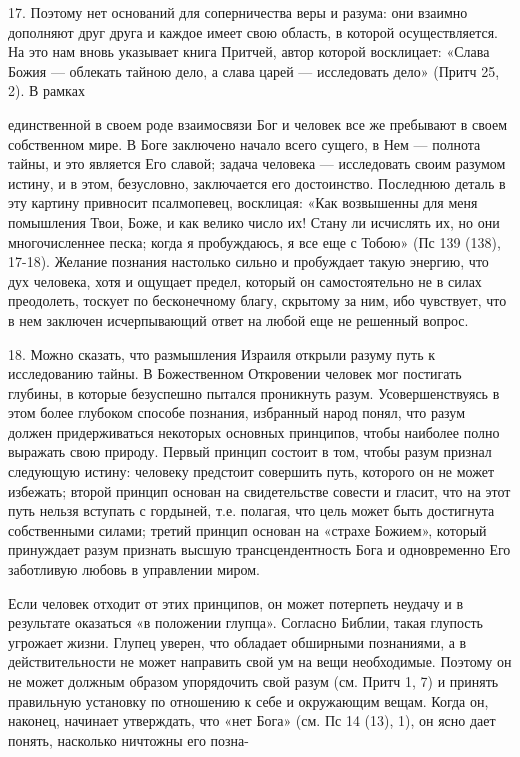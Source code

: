 \documentclass[a5paper,10pt]{article}
\begin{document}
17. Поэтому нет оснований для соперничества веры и разума: они взаимно
дополняют друг друга и каждое имеет свою область, в которой осуществляется. На
это нам вновь указывает книга Притчей, автор которой восклицает: «Слава Божия —
облекать тайною дело, а слава царей — исследовать дело» (Притч 25, 2). В рамках

единственной в своем роде взаимосвязи Бог и человек все же пребывают в своем
собственном мире. В Боге заключено начало всего сущего, в Нем — полнота тайны,
и это является Его славой; задача человека — исследовать своим разумом истину,
и в этом, безусловно, заключается его достоинство. Последнюю деталь в эту
картину привносит псалмопевец, восклицая: «Как возвышенны для меня помышления
Твои, Боже, и как велико число их! Стану ли исчислять их, но они многочисленнее
песка; когда я пробуждаюсь, я все еще с Тобою» (Пс 139 (138), 17-18). Желание
познания настолько сильно и пробуждает такую энергию, что дух человека, хотя и
ощущает предел, который он самостоятельно не в силах преодолеть, тоскует по
бесконечному благу, скрытому за ним, ибо чувствует, что в нем заключен
исчерпывающий ответ на любой еще не решенный вопрос.

18. Можно сказать, что размышления Израиля открыли разуму путь к исследованию
тайны. В Божественном Откровении человек мог постигать глубины, в которые
безуспешно пытался проникнуть разум. Усовершенствуясь в этом более глубоком
способе познания, избранный народ понял, что разум должен придерживаться
некоторых основных принципов, чтобы наиболее полно выражать свою природу.
Первый принцип состоит в том, чтобы разум признал следующую истину: человеку
предстоит совершить путь, которого он не может избежать; второй принцип основан
на свидетельстве совести и гласит, что на этот путь нельзя вступать с гордыней,
т.е. полагая, что цель может быть достигнута собственными силами; третий
принцип основан на «страхе Божием», который принуждает разум признать высшую
трансцендентность Бога и одновременно Его заботливую любовь в управлении миром.

Если человек отходит от этих принципов, он может потерпеть неудачу и в
результате оказаться «в положении глупца». Согласно Библии, такая глупость
угрожает жизни. Глупец уверен, что обладает обширными познаниями, а в
действительности не может направить свой ум на вещи необходимые. Поэтому он не
может должным образом упорядочить свой разум (см. Притч 1, 7) и принять
правильную установку по отношению к себе и окружающим вещам. Когда он, наконец,
начинает утверждать, что «нет Бога» (см. Пс 14 (13), 1), он ясно дает понять,
насколько ничтожны его позна-
\end{document}

